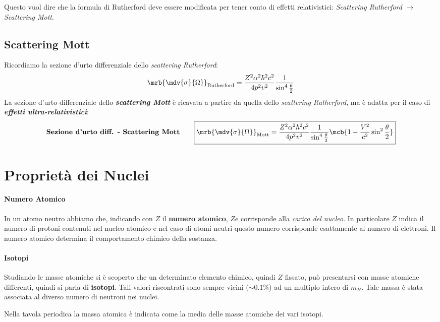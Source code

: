 Questo vuol dire che la formula di Rutherford deve essere modificata per tener
conto di effetti relativistici: \textit{Scattering Rutherford} $\rightarrow$
\textit{Scattering Mott}.

\subsection{Scattering Mott}
Ricordiamo la sezione d'urto differenziale dello \textit{scattering
Rutherford}:
\[
  \mrb{\mdv{\sigma}{\Omega}}_\text{Rutherford} = \frac{Z^2 \alpha^2 \hbar^2
  c^2}{4 p^2 v^2} \frac{1}{\sin^{4} \frac{\theta}{2}}
\]
La sezione d'urto differenziale dello \textit{\textbf{scattering Mott}} è
ricavata a partire da quella dello \textit{scattering Rutherford}, ma è adatta
per il caso di \textit{\textbf{effetti ultra-relativistici}}:
\begin{align*}
  \textbf{Sezione d'urto diff. - Scattering Mott}\qquad
  \boxed{
    \mrb{\mdv{\sigma}{\Omega}}_\text{Mott} = \frac{Z^2 \alpha^2 \hbar^2 c^2}{4
    p^2 v^2} \frac{1}{\sin^{4} \frac{\theta}{2}} \mcb{1 - \frac{V^2}{c^2}
    \sin^2 \frac{\theta}{2}}
  }
\end{align*}

\section{Proprietà dei Nuclei}
\paragraph{Numero Atomico}
In un atomo neutro abbiamo che, indicando con $Z$ il \textbf{numero atomico},
$Ze$ corrisponde alla \textit{carica del nucleo}. In particolare $Z$ indica il
numero di protoni contenuti nel nucleo atomico e nel caso di atomi neutri
questo numero corrisponde esattamente al numero di elettroni. Il numero atomico
determina il comportamento chimico della sostanza.

\paragraph{Isotopi}
Studiando le masse atomiche si è scoperto che un determinato elemento chimico,
quindi $Z$ fissato, può presentarsi con masse atomiche differenti,
quindi si parla di \textbf{isotopi}. Tali valori riscontrati sono sempre vicini
($\sim 0.1\%$) ad un multiplo intero di $m_H$.
Tale massa è stata associata al diverso numero di neutroni nei nuclei.

Nella tavola periodica la massa atomica è indicata come la media delle masse
atomiche dei vari isotopi.

